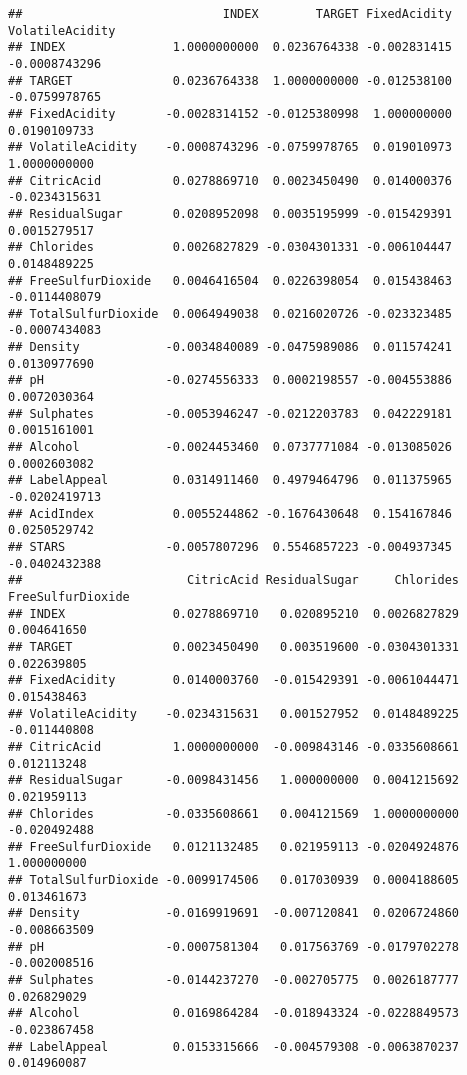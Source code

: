 \documentclass[
]{article}
\begin{document}
\begin{verbatim}
##                            INDEX        TARGET FixedAcidity VolatileAcidity
## INDEX               1.0000000000  0.0236764338 -0.002831415   -0.0008743296
## TARGET              0.0236764338  1.0000000000 -0.012538100   -0.0759978765
## FixedAcidity       -0.0028314152 -0.0125380998  1.000000000    0.0190109733
## VolatileAcidity    -0.0008743296 -0.0759978765  0.019010973    1.0000000000
## CitricAcid          0.0278869710  0.0023450490  0.014000376   -0.0234315631
## ResidualSugar       0.0208952098  0.0035195999 -0.015429391    0.0015279517
## Chlorides           0.0026827829 -0.0304301331 -0.006104447    0.0148489225
## FreeSulfurDioxide   0.0046416504  0.0226398054  0.015438463   -0.0114408079
## TotalSulfurDioxide  0.0064949038  0.0216020726 -0.023323485   -0.0007434083
## Density            -0.0034840089 -0.0475989086  0.011574241    0.0130977690
## pH                 -0.0274556333  0.0002198557 -0.004553886    0.0072030364
## Sulphates          -0.0053946247 -0.0212203783  0.042229181    0.0015161001
## Alcohol            -0.0024453460  0.0737771084 -0.013085026    0.0002603082
## LabelAppeal         0.0314911460  0.4979464796  0.011375965   -0.0202419713
## AcidIndex           0.0055244862 -0.1676430648  0.154167846    0.0250529742
## STARS              -0.0057807296  0.5546857223 -0.004937345   -0.0402432388
##                       CitricAcid ResidualSugar     Chlorides FreeSulfurDioxide
## INDEX               0.0278869710   0.020895210  0.0026827829       0.004641650
## TARGET              0.0023450490   0.003519600 -0.0304301331       0.022639805
## FixedAcidity        0.0140003760  -0.015429391 -0.0061044471       0.015438463
## VolatileAcidity    -0.0234315631   0.001527952  0.0148489225      -0.011440808
## CitricAcid          1.0000000000  -0.009843146 -0.0335608661       0.012113248
## ResidualSugar      -0.0098431456   1.000000000  0.0041215692       0.021959113
## Chlorides          -0.0335608661   0.004121569  1.0000000000      -0.020492488
## FreeSulfurDioxide   0.0121132485   0.021959113 -0.0204924876       1.000000000
## TotalSulfurDioxide -0.0099174506   0.017030939  0.0004188605       0.013461673
## Density            -0.0169919691  -0.007120841  0.0206724860      -0.008663509
## pH                 -0.0007581304   0.017563769 -0.0179702278      -0.002008516
## Sulphates          -0.0144237270  -0.002705775  0.0026187777       0.026829029
## Alcohol             0.0169864284  -0.018943324 -0.0228849573      -0.023867458
## LabelAppeal         0.0153315666  -0.004579308 -0.0063870237       0.014960087

\end{verbatim}
\end{document}
